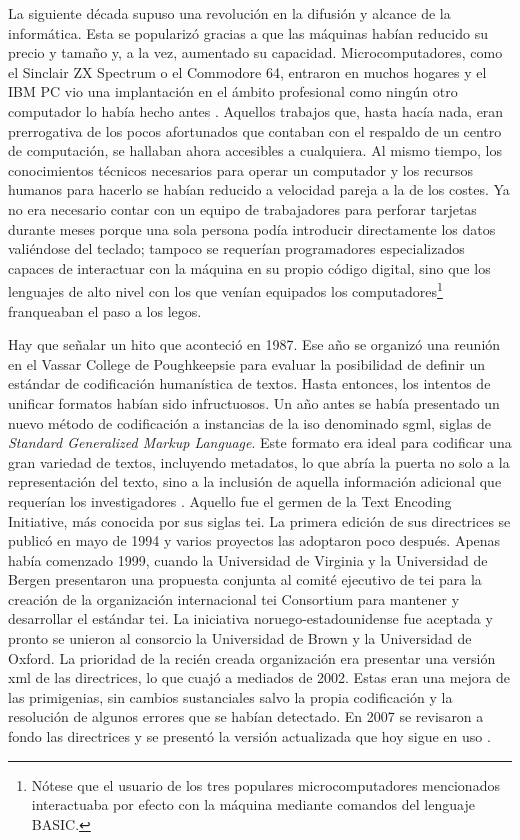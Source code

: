 La siguiente década supuso una revolución en la difusión y alcance de la informática. Esta se popularizó gracias a que las máquinas habían reducido su precio y tamaño y, a la vez, aumentado su capacidad. Microcomputadores, como el Sinclair ZX Spectrum o el Commodore 64, entraron en muchos hogares y el IBM PC vio una implantación en el ámbito profesional como ningún otro computador lo había hecho antes \parencite{fradejas2022a}. Aquellos trabajos que, hasta hacía nada, eran prerrogativa de los pocos afortunados que contaban con el respaldo de un centro de computación, se hallaban ahora accesibles a cualquiera. Al mismo tiempo, los conocimientos técnicos necesarios para operar un computador y los recursos humanos para hacerlo se habían reducido a velocidad pareja a la de los costes. Ya no era necesario contar con un equipo de trabajadores para perforar tarjetas durante meses porque una sola persona podía introducir directamente los datos valiéndose del teclado; tampoco se requerían programadores especializados capaces de interactuar con la máquina en su propio código digital, sino que los lenguajes de alto nivel con los que venían equipados los computadores\footnote{Nótese que el usuario de los tres populares microcomputadores mencionados interactuaba por efecto con la máquina mediante comandos del lenguaje BASIC.} franqueaban el paso a los legos.

Hay que señalar un hito que aconteció en 1987. Ese año se organizó una reunión en el Vassar College de Poughkeepsie para evaluar la posibilidad de definir un estándar de codificación humanística de textos. Hasta entonces, los intentos de unificar formatos habían sido infructuosos. Un año antes se había presentado un nuevo método de codificación a instancias de la \ac{iso} denominado \ac{sgml}, siglas de \textit{Standard Generalized Markup Language}. Este formato era ideal para codificar una gran variedad de textos, incluyendo metadatos, lo que abría la puerta no solo a la representación del texto, sino a la inclusión de aquella información adicional que requerían los investigadores \parencite[12-13]{hockey2004}. Aquello fue el germen de la Text Encoding Initiative, más conocida por sus siglas \ac{tei}. La primera edición de sus directrices se publicó en mayo de 1994 y varios proyectos las adoptaron poco después. Apenas había comenzado 1999, cuando la Universidad de Virginia y la Universidad de Bergen presentaron una propuesta conjunta al comité ejecutivo de \ac{tei} para la creación de la organización internacional \ac{tei} Consortium para mantener y desarrollar el estándar \ac{tei}. La iniciativa noruego-estadounidense fue aceptada y pronto se unieron al consorcio la Universidad de Brown y la Universidad de Oxford. La prioridad de la recién creada organización era presentar una versión \ac{xml} de las directrices, lo que cuajó a mediados de 2002. Estas eran una mejora de las primigenias, sin cambios sustanciales salvo la propia codificación y la resolución de algunos errores que se habían detectado. En 2007 se revisaron a fondo las directrices y se presentó la versión actualizada que hoy sigue en uso \parencite{tei2005}.

